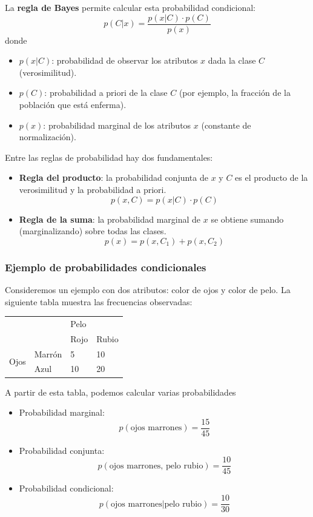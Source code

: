 La \textbf{regla de Bayes} permite calcular esta probabilidad condicional:
$$p(C|x) = \frac{p(x|C) \cdot p(C)}{p(x)}$$
donde
\begin{itemize}
\item $p(x|C)$: probabilidad de observar los atributos $x$ dada la clase $C$ (verosimilitud).
\item $p(C)$: probabilidad a priori de la clase $C$ (por ejemplo, la fracción de la población que está enferma).
\item $p(x)$: probabilidad marginal de los atributos $x$ (constante de normalización).
\end{itemize}

Entre las reglas de probabilidad hay dos fundamentales:
\begin{itemize}
\item \textbf{Regla del producto}: la probabilidad conjunta de $x$ y $C$ es el producto de la verosimilitud y la probabilidad a priori.
$$p(x, C) = p(x|C) \cdot p(C)$$

\item \textbf{Regla de la suma}: la probabilidad marginal de $x$ se obtiene sumando (marginalizando) sobre todas las clases.
$$p(x) = p(x, C_1) + p(x, C_2)$$
\end{itemize}

\subsubsection{Ejemplo de probabilidades condicionales}
Consideremos un ejemplo con dos atributos: color de ojos y color de pelo. La siguiente tabla muestra las frecuencias observadas:
\begin{table}[h]
\centering
\begin{tabular}{ll|ll|}
\cline{3-4}
                                            &        & \multicolumn{2}{l|}{Pelo}         \\ \cline{3-4} 
                                            &        & \multicolumn{1}{l|}{Rojo} & Rubio \\ \hline
\multicolumn{1}{|l|}{\multirow{2}{*}{Ojos}} & Marrón & \multicolumn{1}{l|}{5}    & 10    \\ \cline{2-4} 
\multicolumn{1}{|l|}{}                      & Azul   & \multicolumn{1}{l|}{10}   & 20    \\ \hline
\end{tabular}
\end{table}

A partir de esta tabla, podemos calcular varias probabilidades
\begin{itemize}
\item Probabilidad marginal:
$$p(\text{ojos marrones}) = \frac{15}{45}$$

\item Probabilidad conjunta:
$$p(\text{ojos marrones, pelo rubio}) = \frac{10}{45}$$

\item Probabilidad condicional:
$$p(\text{ojos marrones}|\text{pelo rubio}) = \frac{10}{30}$$
\end{itemize}

